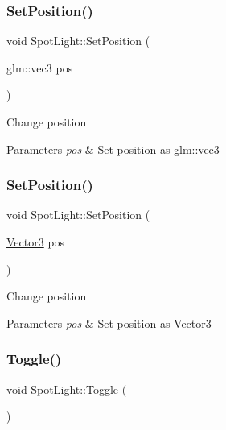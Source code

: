 \subsubsection{\texorpdfstring{SetPosition()}{SetPosition()}\hspace{0.1cm}{\footnotesize\ttfamily [1/2]}}
{\footnotesize\ttfamily void Spot\+Light\+::\+Set\+Position (\begin{DoxyParamCaption}\item[{glm\+::vec3}]{pos }\end{DoxyParamCaption})}

Change position 
\begin{DoxyParams}{Parameters}
{\em pos} & Set position as glm\+::vec3 \\
\hline
\end{DoxyParams}
\mbox{\label{class_spot_light_a84e9c89257d8c097686bcb1ffdb637ac}} 
\subsubsection{\texorpdfstring{SetPosition()}{SetPosition()}\hspace{0.1cm}{\footnotesize\ttfamily [2/2]}}
{\footnotesize\ttfamily void Spot\+Light\+::\+Set\+Position (\begin{DoxyParamCaption}\item[{\mbox{\hyperlink{struct_vector3}{Vector3}}}]{pos }\end{DoxyParamCaption})}

Change position 
\begin{DoxyParams}{Parameters}
{\em pos} & Set position as \mbox{\hyperlink{struct_vector3}{Vector3}} \\
\hline
\end{DoxyParams}
\mbox{\label{class_spot_light_ab0262f44ab1cd6547ca4dce1ca7cffb2}} 
\subsubsection{\texorpdfstring{Toggle()}{Toggle()}}
{\footnotesize\ttfamily void Spot\+Light\+::\+Toggle (\begin{DoxyParamCaption}{ }\end{DoxyParamCaption})}

